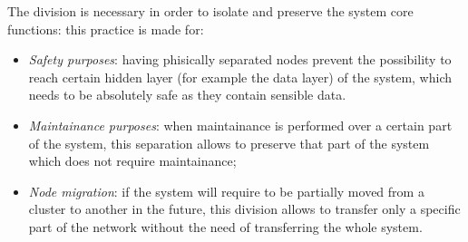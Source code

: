 The division is necessary in order to isolate and preserve the system core functions: this practice is made for:
\begin{itemize}
    \item \textit{Safety purposes}: having phisically separated nodes prevent the possibility to reach certain hidden layer (for example the data layer) of the system, which needs to be absolutely safe as they contain sensible data.
    \item \textit{Maintainance purposes}: when maintainance is performed over a certain part of the system, this separation allows to preserve that part of the system which does not require maintainance;
    \item \textit{Node migration}: if the system will require to be partially moved from a cluster to another in the future, this division allows to transfer only a specific part of the network without the need of transferring the whole system.
\end{itemize}


